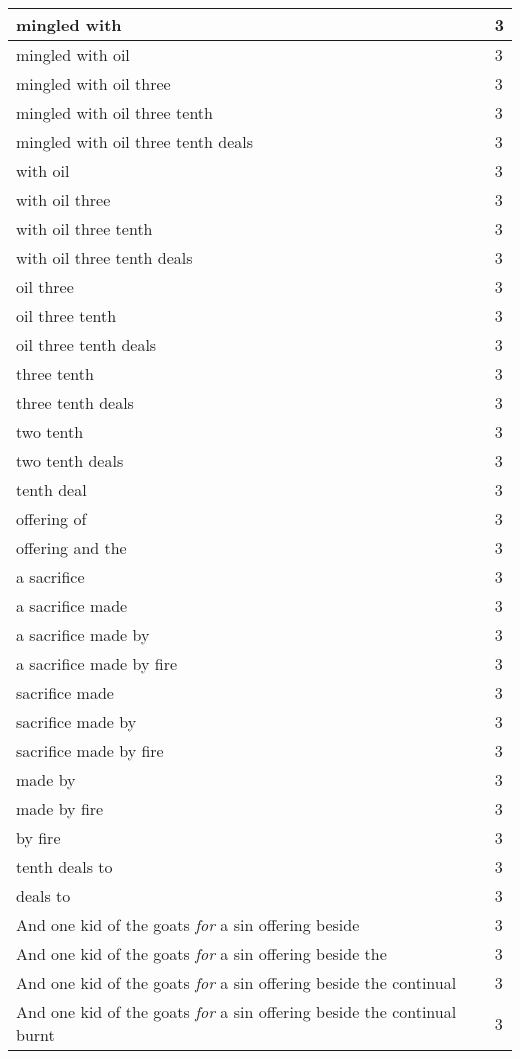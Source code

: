 \begin{center}
\begin{longtable}{|p{3.0in}|p{0.5in}|}
mingled with & 3\\ \hline 
mingled with oil & 3\\ \hline 
mingled with oil three & 3\\ \hline 
mingled with oil three tenth & 3\\ \hline 
mingled with oil three tenth deals & 3\\ \hline 
with oil & 3\\ \hline 
with oil three & 3\\ \hline 
with oil three tenth & 3\\ \hline 
with oil three tenth deals & 3\\ \hline 
oil three & 3\\ \hline 
oil three tenth & 3\\ \hline 
oil three tenth deals & 3\\ \hline 
three tenth & 3\\ \hline 
three tenth deals & 3\\ \hline 
two tenth & 3\\ \hline 
two tenth deals & 3\\ \hline 
tenth deal & 3\\ \hline 
offering of & 3\\ \hline 
offering and the & 3\\ \hline 
a sacrifice & 3\\ \hline 
a sacrifice made & 3\\ \hline 
a sacrifice made by & 3\\ \hline 
a sacrifice made by fire & 3\\ \hline 
sacrifice made & 3\\ \hline 
sacrifice made by & 3\\ \hline 
sacrifice made by fire & 3\\ \hline 
made by & 3\\ \hline 
made by fire & 3\\ \hline 
by fire & 3\\ \hline 
tenth deals to & 3\\ \hline 
deals to & 3\\ \hline 
And one kid of the goats \emph{for} a sin offering beside & 3\\ \hline 
And one kid of the goats \emph{for} a sin offering beside the & 3\\ \hline 
And one kid of the goats \emph{for} a sin offering beside the continual & 3\\ \hline 
And one kid of the goats \emph{for} a sin offering beside the continual burnt & 3\\ \hline 

\end{longtable}
\end{center}
